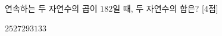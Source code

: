 연속하는 두 자연수의 곱이 $182$일 때, 두 자연수의 합은? \mbox{[4점]}
\begin{choices32}{$25$}{$27$}{$29$}{$31$}{$33$}\end{choices32}
